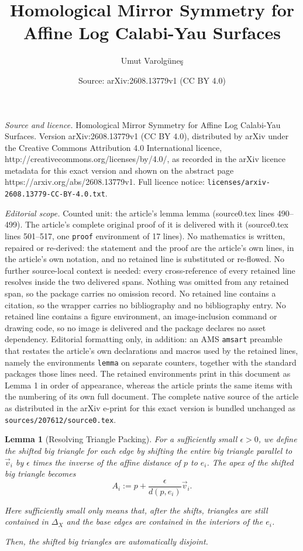 \documentclass[10pt,a4paper]{amsart}
\title{Homological Mirror Symmetry for Affine Log Calabi-Yau Surfaces}
\author{Umut Varolg\"une\c{s}}
\date{Source: arXiv:2608.13779v1 (CC BY 4.0)}
\newtheorem{lemma}{Lemma}
\begin{document}
\maketitle

\noindent\emph{Source and licence.} Homological Mirror Symmetry for Affine Log Calabi-Yau Surfaces. Version arXiv:2608.13779v1 (CC BY 4.0), distributed by arXiv under the Creative Commons Attribution 4.0 International licence, http://creativecommons.org/licenses/by/4.0/, as recorded in the arXiv licence metadata for this exact version and shown on the abstract page https://arxiv.org/abs/2608.13779v1. Full licence notice: \texttt{licenses/arxiv-2608.13779-CC-BY-4.0.txt}.\par\smallskip

\noindent\textit{Editorial scope.} Counted unit: the article's lemma lemma (source0.tex lines 490--499). The article's complete original proof of it is delivered with it (source0.tex lines 501--517, one \texttt{proof} environment of 17 lines). No mathematics is written, repaired or re-derived: the statement and the proof are the article's own lines, in the article's own notation, and no retained line is substituted or re-flowed.  No further source-local context is needed: every cross-reference of every retained line resolves inside the two delivered spans.  Nothing was omitted from any retained span, so the package carries no omission record.  No retained line contains a citation, so the wrapper carries no bibliography and no bibliography entry.  No retained line contains a figure environment, an image-inclusion command or drawing code, so no image is delivered and the package declares no asset dependency.  Editorial formatting only, in addition: an AMS \texttt{amsart} preamble that restates the article's own declarations and macros used by the retained lines, namely the environments \texttt{lemma} on separate counters, together with the standard packages those lines need.  The retained environments print in this document as Lemma 1 in order of appearance, whereas the article prints the same items with the numbering of its own full document.  The complete native source of the article as distributed in the arXiv e-print for this exact version is bundled unchanged as \texttt{sources/207612/source0.tex}.
\begin{lemma}[Resolving Triangle Packing]
For a sufficiently small $\epsilon > 0$, we define the shifted big triangle for each edge by shifting the entire big triangle parallel to $\vec{v}_i$ by $\epsilon$ times the inverse of the affine distance of $p$ to $e_i$. The apex of the shifted big triangle becomes
\begin{equation}
    A_i := p + \frac{\epsilon}{d(p, e_i)} \vec{v}_i.
\end{equation} 

Here sufficiently small only means that, after the shifts, triangles are still contained in $\Delta_X$ and the base edges are contained in the interiors of the $e_i$. 

Then, the shifted big triangles are automatically disjoint.
\end{lemma}
\end{document}
